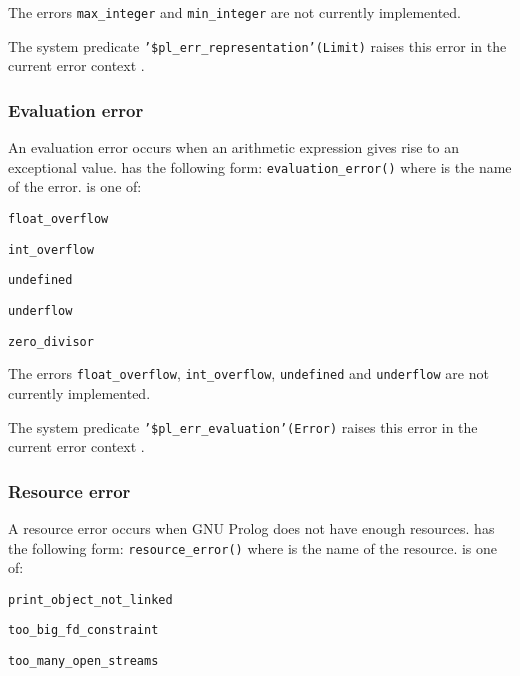 The errors \texttt{max\_integer} and \texttt{min\_integer} are not currently
implemented.

The system predicate \texttt{'\$pl\_err\_representation'(Limit)} raises this 
error in the current error context .

\subsubsection{Evaluation error}
\label{Evaluation-error}
An evaluation error occurs when an arithmetic expression gives rise to
an exceptional value.  has the following form:
\texttt{evaluation\_error()} where  is
the name of the error.  is one of:

\begin{ItemizeThreeCols}

\item \texttt{float\_overflow}

\item \texttt{int\_overflow}

\item \texttt{undefined}

\item \texttt{underflow}

\item \texttt{zero\_divisor}

\end{ItemizeThreeCols}

The errors \texttt{float\_overflow}, \texttt{int\_overflow},
\texttt{undefined} and \texttt{underflow} are not currently
implemented.

The system predicate \texttt{'\$pl\_err\_evaluation'(Error)} raises this
error in the current error context .

\subsubsection{Resource error}
\label{Resource-error}
A resource error occurs when GNU Prolog does not have enough resources.
 has the following form:
\texttt{resource\_error()} where  is the
name of the resource.  is one of:

\begin{ItemizeThreeCols}

\item \texttt{print\_object\_not\_linked}

\item \texttt{too\_big\_fd\_constraint}

\item \texttt{too\_many\_open\_streams}

\end{ItemizeThreeCols}

